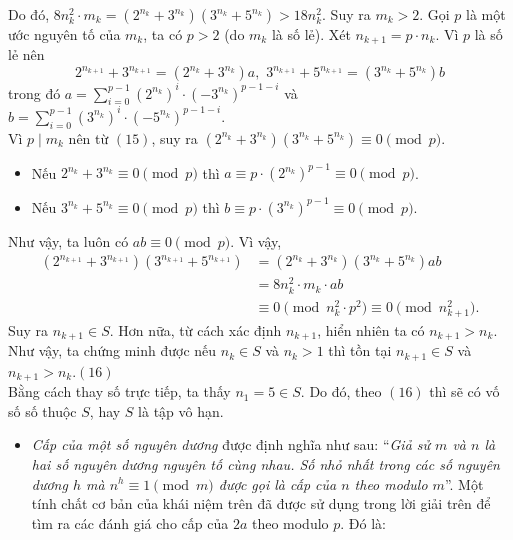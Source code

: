 \begin{bt}
{\begin{enumerate}
			Do đó, $ 8n_{k}^{2}\cdot m_{k}=(2^{n_{k}}+3^{n_{k}})(3^{n_{k}}+5^{n_{k}})>18n_{k}^{2} $. Suy ra $ m_{k}>2 $.
			Gọi $ p $ là một ước nguyên tố của $ m_{k} $, ta có $ p>2 $ (do $ m_{k} $ là số lẻ).
			Xét $ n_{k+1}=p\cdot n_{k} $. Vì $ p $ là số lẻ nên 
			$$ 2^{n_{k+1}}+3^{n_{k+1}}=(2^{n_{k}}+3^{n_{k}})a, \,\, 3^{n_{k+1}}+5^{n_{k+1}}=(3^{n_{k}}+5^{n_{k}})b$$
			trong đó 
			$ a=\displaystyle\sum\limits_{i=0}^{p-1}(2^{n_{k}})^{i}\cdot (-3^{n_{k}})^{p-1-i} $ và $ b=\displaystyle\sum\limits_{i=0}^{p-1}(3^{n_{k}})^{i}\cdot (-5^{n_{k}})^{p-1-i} $.\\
			Vì $ p\mid m_{k} $ nên từ $ (15) $, suy ra 
			$ (2^{n_{k}}+3^{n_{k}})(3^{n_{k}}+5^{n_{k}})\equiv 0\pmod{p}.$
			\begin{itemize}
				\item Nếu $ 2^{n_{k}}+3^{n_{k}}\equiv 0\pmod{p} $ thì $ a\equiv p\cdot (2^{n_{k}})^{p-1}\equiv 0\pmod{p} $.
				\item Nếu $ 3^{n_{k}}+5^{n_{k}}\equiv 0\pmod{p} $ thì $ b\equiv p\cdot (3^{n_{k}})^{p-1}\equiv 0\pmod{p} $.
			\end{itemize}
			Như vậy, ta luôn có $ ab\equiv 0\pmod{p} $. Vì vậy,
			\begin{align*}
			(2^{n_{k+1}}+3^{n_{k+1}})(3^{n_{k+1}}+5^{n_{k+1}})&=(2^{n_{k}}+3^{n_{k}})(3^{n_{k}}+5^{n_{k}})ab\\
			&=8n_{k}^{2}\cdot m_{k}\cdot ab\\
			&\equiv 0\pmod{n_{k}^{2}\cdot p^{2}}\equiv 0\pmod{n_{k+1}^{2}}.
			\end{align*}
			Suy ra $ n_{k+1}\in S $. Hơn nữa, từ cách xác định $ n_{k+1} $, hiển nhiên ta có $ n_{k+1}>n_{k} $.
			Như vậy, ta chứng minh được nếu $ n_{k}\in S $ và $ n_{k}>1 $ thì tồn tại $ n_{k+1}\in S $ và $ n_{k+1}>n_{k} $.\hfill$ (16) $\\
			Bằng cách thay số trực tiếp, ta thấy $ n_{1}=5\in S $. Do đó, theo $ (16) $ thì sẽ có vố số số thuộc $ S $, hay $ S $ là tập vô hạn.
		\end{enumerate}
	\begin{nx}
	\hfill
	\begin{itemize}
		\item \textit{Cấp của một số nguyên dương} được định nghĩa như sau:
		``\textit{Giả sử $ m $ và $ n $ là hai số nguyên dương nguyên tố cùng nhau. Số nhỏ nhất trong các số nguyên dương $ h $ mà $ n^{h}\equiv 1\pmod{m} $ được gọi là cấp của $ n $ theo modulo $ m $}''.
		Một tính chất cơ bản của khái niệm trên đã được sử dụng trong lời giải trên để tìm ra các đánh giá cho cấp của $ 2a $ theo modulo $ p $. Đó là:

\end{itemize}
\end{nx}}
\end{bt}
